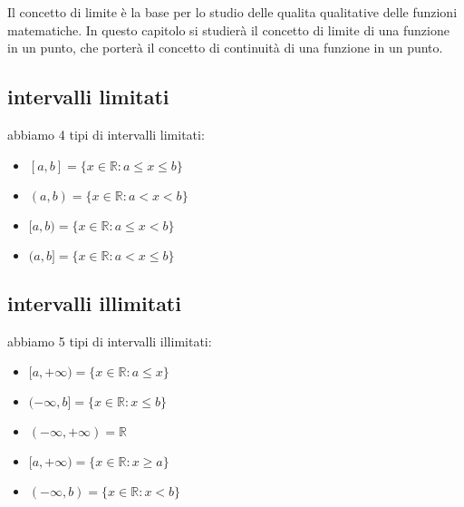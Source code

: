 Il concetto di limite è la base per lo studio delle qualita qualitative delle funzioni
matematiche. In questo capitolo si studierà il concetto di limite di una funzione in un
punto, che porterà il concetto di continuità di una funzione in un punto.
\subsection{intervalli limitati}
\label{subsec:intervalli_limitati}
abbiamo 4 tipi di intervalli limitati:
\begin{itemize}
    \item $[a,b] = \{x \in \mathbb{R} : a \leq x \leq b\}$
    \item $(a,b) = \{x \in \mathbb{R} : a < x < b\}$
    \item $[a,b) = \{x \in \mathbb{R} : a \leq x < b\}$
    \item $(a,b] = \{x \in \mathbb{R} : a < x \leq b\}$
\end{itemize}
\subsection{intervalli illimitati}
\label{subsec:intervalli_illimitati}
abbiamo 5 tipi di intervalli illimitati:
\begin{itemize}
    \item $[a,+\infty) = \{x \in \mathbb{R} : a \leq x\}$
    \item $(-\infty,b] = \{x \in \mathbb{R} : x \leq b\}$
    \item $(-\infty,+\infty) = \mathbb{R}$
    \item $[a,+\infty) = \{x \in \mathbb{R} : x \geq a\}$
    \item $(-\infty,b) = \{x \in \mathbb{R} : x < b\}$
    \end{itemize}
    